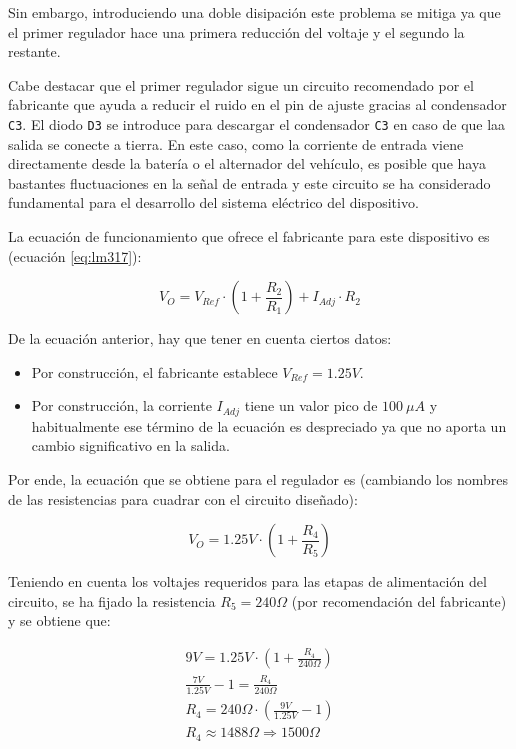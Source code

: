 Sin embargo, introduciendo una doble disipación este problema se mitiga ya que el
primer regulador hace una primera reducción del voltaje y el segundo la restante.

Cabe destacar que el primer regulador sigue un circuito recomendado por el fabricante
que ayuda a reducir el ruido en el pin de ajuste gracias al condensador \texttt{C3}.
El diodo \texttt{D3} se introduce para descargar el condensador \texttt{C3} en caso de
que laa salida se conecte a tierra. En este caso, como la corriente de entrada viene
directamente desde la batería o el alternador del vehículo, es posible que haya
bastantes fluctuaciones en la señal de entrada y este circuito se ha considerado
fundamental para el desarrollo del sistema eléctrico del dispositivo.

La ecuación de funcionamiento que ofrece el fabricante para este dispositivo es
(ecuación \ref{eq:lm317}):

\begin{equation}\label{eq:lm317}
  V_O = V_{Ref} \cdot \left(1 + \frac{R_2}{R_1}\right) + I_{Adj} \cdot R_2
\end{equation}

De la ecuación anterior, hay que tener en cuenta ciertos datos:

\begin{itemize}
  \item Por construcción, el fabricante establece $V_{Ref} = 1.25V$.
  \item Por construcción, la corriente $I_{Adj}$ tiene un valor pico de $100~\mu A$
        y habitualmente ese término de la ecuación es despreciado ya que no aporta
        un cambio significativo en la salida.
\end{itemize}

Por ende, la ecuación que se obtiene para el regulador es (cambiando los nombres de
las resistencias para cuadrar con el circuito diseñado):

\begin{equation*}
  V_O = 1.25V \cdot \left(1 + \frac{R_4}{R_5}\right)
\end{equation*}

Teniendo en cuenta los voltajes requeridos para las etapas de alimentación del
circuito, se ha fijado la resistencia $R_5 = 240\Omega$ (por recomendación del
fabricante) y se obtiene que:

\begin{gather*}
  9V = 1.25V \cdot \left(1 + \frac{R_4}{240\Omega}\right) \\
  \frac{7V}{1.25V} - 1 = \frac{R_4}{240\Omega} \\
  R_4 = 240\Omega \cdot \left(\frac{9V}{1.25V} - 1\right) \\
  R_4 \approx 1488\Omega \Longrightarrow 1500\Omega
\end{gather*}

